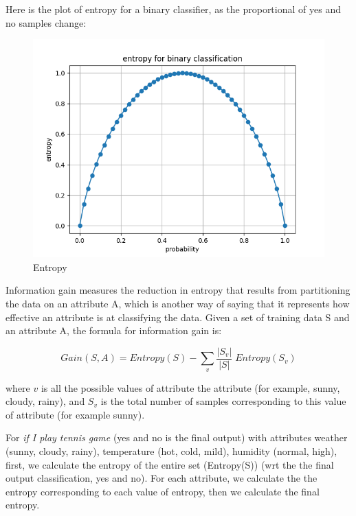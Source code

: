 \documentclass[12pt]{report}
\begin{document}
Here is the plot of entropy for a binary classifier, as the proportional of yes and no samples change:


\begin{figure}[H]
	\centering
	\caption{Entropy}
	\includegraphics[scale=0.5]{entroy.png}
\end{figure}




Information gain measures the reduction in entropy that results from partitioning the data on an attribute A, which is another way of saying that it represents how effective an attribute is at classifying the data. Given a set of training data S and an attribute A, the formula for information gain is:

\begin{equation}
	Gain(S,A)  = Entropy(S) - \sum_v  \frac{|S_v|}{|S|} \; Entropy(S_v)
\end{equation}


where $v$ is all the possible values of attribute the attribute (for example, sunny, cloudy, rainy), and $S_v$ is the total number of samples corresponding to this value of attribute (for example sunny).

For \textit{if I play tennis game} (yes and no is the final output) with attributes weather (sunny, cloudy, rainy), temperature (hot, cold, mild), humidity (normal, high),  first, we calculate the entropy of the entire set (Entropy(S)) (wrt the the final output classification, yes and no). For each attribute, we calculate the the entropy corresponding to each value of entropy, then we calculate the final entropy.
\end{document}
